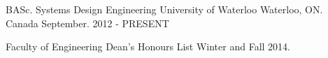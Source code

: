

\begin{cventries}

  \cventry
    {BASc. Systems Design Engineering} %
    {University of Waterloo} %
    {Waterloo, ON. Canada} %
    {September. 2012 - PRESENT} %
    {
      \begin{cvitems} %
      	\item{Faculty of Engineering Dean’s Honours List Winter and Fall 2014.}
      \end{cvitems}
    }

\end{cventries}
